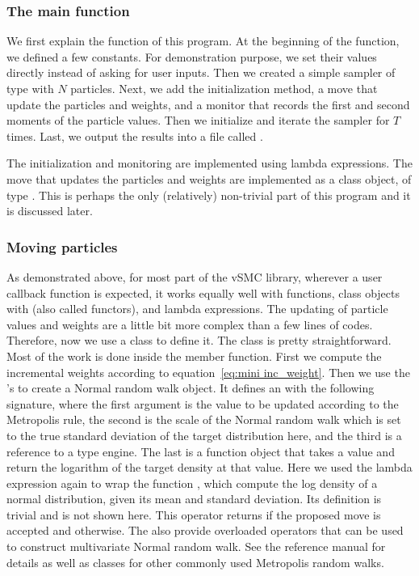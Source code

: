 \subsubsection{The main function}
\label{ssub:The main function}

We first explain the  function of this program.
At the beginning of the function, we defined a few constants. For
demonstration purpose, we set their values directly instead of asking for user
inputs. Then we created a simple sampler of type 
with $N$ particles. Next, we add the initialization method, a move that update
the particles and weights, and a monitor that records the first and second
moments of the particle values. Then we initialize and iterate the sampler for
$T$ times. Last, we output the results into a file called
.

The initialization and monitoring are implemented using \cpp lambda
expressions. The move that updates the particles and weights are implemented
as a class object, of type . This is perhaps the only
(relatively) non-trivial part of this program and it is discussed later.

\subsubsection{Moving particles}
\label{ssub:Moving particles}

As demonstrated above, for most part of the vSMC library, wherever a user
callback function is expected, it works equally well with functions, class
objects with  (also called functors), and lambda
expressions. The updating of particle values and weights are a little bit more
complex than a few lines of codes. Therefore, now we use a class to define it.
The class is pretty straightforward. Most of the work is done inside the
 member function. First we compute the incremental
weights according to equation~\eqref{eq:mini inc_weight}. Then we use the
\vsmc's  to create a Normal random walk object. It defines
an  with the following signature,
where the first argument is the value to be updated according to the
Metropolis rule, the second is the scale of the Normal random walk which is
set to the true standard deviation of the target distribution here, and the
third is a reference to a \cppoo type \rng engine. The last is a function
object that takes a value and return the logarithm of the target density at
that value. Here we used the \cppoo lambda expression again to wrap the
function , which compute the log density of a normal
distribution, given its mean and standard deviation. Its definition is trivial
and is not shown here. This operator returns  if the proposed
move is accepted and  otherwise. The 
also provide overloaded operators that can be used to construct multivariate
Normal random walk. See the reference manual for details as well as classes
for other commonly used Metropolis random walks.

